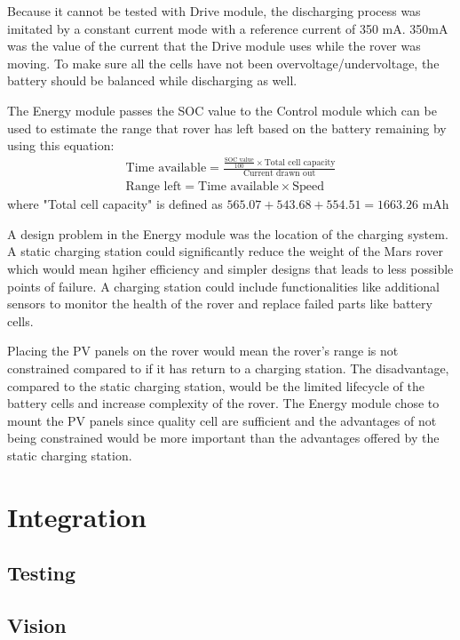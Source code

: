 \documentclass[11pt, a4paper]{article}
\begin{document}
Because it cannot be tested with Drive module, the discharging process was imitated by a constant current mode with a reference current of 350 mA. 350mA was the value of the current that the Drive module uses while the rover was moving. To make sure all the cells have not been overvoltage/undervoltage, the battery should be balanced while discharging as well.

The Energy module passes the SOC value to the Control module which can be used to estimate the range that rover has left based on the battery remaining by using this equation:
\begin{gather*}
    \text{Time available} = \frac{\frac{\text{SOC value}}{100} \times \text{Total cell capacity}}{\text{Current drawn out}} \\
    \text{Range left} = \text{Time available} \times \text{Speed}
\end{gather*}
where "Total cell capacity" is defined as $565.07 + 543.68 + 554.51 = 1663.26$ mAh

A design problem in the Energy module was the location of the charging system. A static charging station could significantly reduce the weight of the Mars rover which would mean hgiher efficiency and simpler designs that leads to less possible points of failure. A charging station could include functionalities like additional sensors to monitor the health of the rover and replace failed parts like battery cells. 

Placing the PV panels on the rover would mean the rover's range is not constrained compared to if it has return to a charging station. The disadvantage, compared to the static charging station, would be the limited lifecycle of the battery cells and increase complexity of the rover. The Energy module chose to mount the PV panels since quality cell are sufficient and the advantages of not being constrained would be more important than the advantages offered by the static charging station.



\pagebreak
\section{Integration}

\subsection{Testing}

\subsection{Vision}
\end{document}
